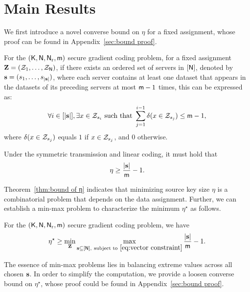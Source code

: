 \documentclass[conference,letterpaper]{IEEEtran}
\begin{document}
\section{Main Results}
\label{sec:main}
We first introduce a novel converse bound on $ \eta $ for a fixed assignment, whose proof can be found in Appendix~\ref{sec:bound proof}.
\begin{thm}
\label{thm:bound of η}
For the $({\sf K},{\sf N},{\sf N}_{\rm r}, {\sf m})$ secure gradient coding problem, for a fixed assignment \(\mathbf{Z} = ({\cal Z}_1, \ldots, {\cal Z}_{{\sf N}})\), if there exists an ordered set of servers in \([{\sf N}]\), denoted by \({\bf s} = (s_1, \ldots, s_{|{\bf s}|})\), where each server contains at least one dataset that appears in the datasets of its preceding servers at most \({\sf m} - 1\) times, this can be expressed as:
\begin{align}
\forall i \in [|{\bf s}|], \exists x \in {\cal Z}_{s_i} \text{ such that } \sum_{j=1}^{i-1} \delta(x \in {\cal Z}_{s_j}) \leq {\sf m} - 1, \label{eq:vector constraint}
\end{align}
where \(\delta(x \in {\cal Z}_{s_j})\) equals \(1\) if \(x \in {\cal Z}_{s_j}\), and \(0\) otherwise.

Under the symmetric transmission and linear coding, it must hold that
\begin{align}
\eta \geq \frac{|{\bf s}|}{{\sf m}}-1. \label{eq:converse lemma}
\end{align}
\end{thm}
Theorem~\ref{thm:bound of η} indicates that minimizing source key size $\eta$ is a combinatorial problem that depends on the data assignment. 
Further, we can establish a min-max problem to characterize the minimum $\eta^{\star}$ as follows.
\begin{cor}
    For the $({\sf K},{\sf N},{\sf N}_{\rm r}, {\sf m})$ secure gradient coding problem, we have
    \begin{align}
\eta^{\star} \geq \min_{\mathbf{Z}}
\max_{{\bf s} \subseteq [{\sf N}], ~\text{subject to}~ \eqref{eq:vector constraint} } \frac{|{\bf s}|}{{\sf m}}-1. \label{eq:converse lemma}
\end{align}
\end{cor}

The essence of min-max problems lies in balancing extreme values across all chosen ${\bf s}$.%
 In order to simplify the computation, we provide a loosen converse bound on $\eta^{\star}$, whose proof could be found in Appendix~\ref{sec:bound proof}.
\end{document}
